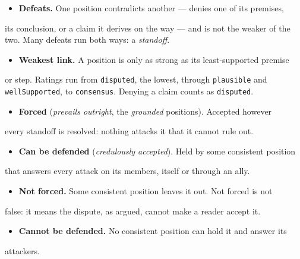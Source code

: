 \documentclass[11pt]{article}
\begin{document}
\begin{itemize}
  \item \textbf{Defeats.} One position contradicts another — denies one of its premises,
\end{itemize}
  its conclusion, or a claim it derives on the way — and is not the weaker of   the two. Many defeats run both ways: a \emph{standoff}.

\begin{itemize}
  \item \textbf{Weakest link.} A position is only as strong as its least-supported premise
\end{itemize}
  or step. Ratings run from \texttt{disputed}, the lowest, through \texttt{plausible} and   \texttt{well\allowbreak{}Supported}, to \texttt{consensus}. Denying a claim counts as \texttt{disputed}.

\begin{itemize}
  \item \textbf{Forced} (\emph{prevails outright}, the \emph{grounded} positions). Accepted however
\end{itemize}
  every standoff is resolved: nothing attacks it that it cannot rule out.

\begin{itemize}
  \item \textbf{Can be defended} (\emph{credulously accepted}). Held by some consistent position
\end{itemize}
  that answers every attack on its members, itself or through an ally.

\begin{itemize}
  \item \textbf{Not forced.} Some consistent position leaves it out. Not forced is not
\end{itemize}
  false: it means the dispute, as argued, cannot make a reader accept it.

\begin{itemize}
  \item \textbf{Cannot be defended.} No consistent position can hold it and answer its
\end{itemize}
  attackers.
\end{document}
